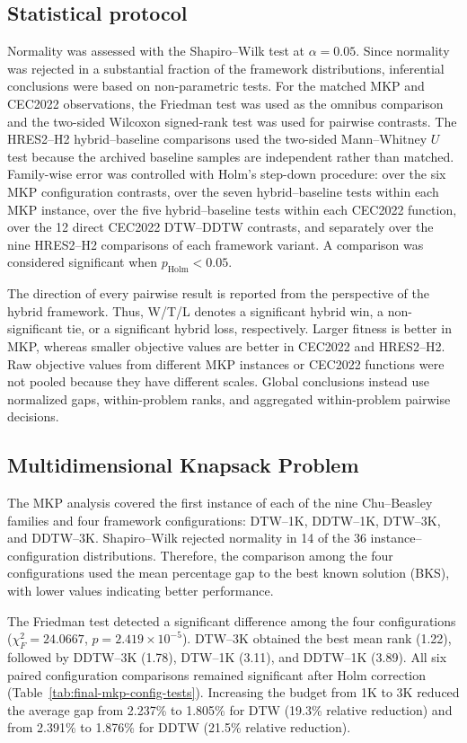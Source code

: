 \documentclass[review]{elsarticle}
\begin{document}
\subsection{Statistical protocol}

Normality was assessed with the Shapiro--Wilk test at $\alpha=0.05$. Since
normality was rejected in a substantial fraction of the framework
distributions, inferential conclusions were based on non-parametric tests. For
the matched MKP and CEC2022 observations, the Friedman test was used as the
omnibus comparison and the two-sided Wilcoxon signed-rank test was used for
pairwise contrasts. The HRES2--H2 hybrid--baseline comparisons used the
two-sided Mann--Whitney $U$ test because the archived baseline samples are
independent rather than matched. Family-wise error was controlled with Holm's
step-down procedure: over the six MKP configuration contrasts, over the seven
hybrid--baseline tests within each MKP instance, over the five
hybrid--baseline tests within each CEC2022 function, over the 12 direct
CEC2022 DTW--DDTW contrasts, and separately over the nine HRES2--H2 comparisons
of each framework variant. A comparison was considered significant when
$p_{\mathrm{Holm}}<0.05$.

The direction of every pairwise result is reported from the perspective of
the hybrid framework. Thus, W/T/L denotes a significant hybrid win, a
non-significant tie, or a significant hybrid loss, respectively. Larger
fitness is better in MKP, whereas smaller objective values are better in
CEC2022 and HRES2--H2. Raw objective values from different MKP instances or
CEC2022 functions were not pooled because they have different scales. Global
conclusions instead use normalized gaps, within-problem ranks, and aggregated
within-problem pairwise decisions.

\subsection{Multidimensional Knapsack Problem}
\label{sec:final-stat-mkp}

The MKP analysis covered the first instance of each of the nine Chu--Beasley
families and four framework configurations: DTW--1K, DDTW--1K, DTW--3K, and
DDTW--3K. Shapiro--Wilk rejected normality in 14 of the 36
instance--configuration distributions. Therefore, the comparison among the
four configurations used the mean percentage gap to the best known solution
(BKS), with lower values indicating better performance.

The Friedman test detected a significant difference among the four
configurations ($\chi_F^2=24.0667$, $p=2.419\times10^{-5}$). DTW--3K obtained
the best mean rank (1.22), followed by DDTW--3K (1.78), DTW--1K (3.11), and
DDTW--1K (3.89). All six paired configuration comparisons remained
significant after Holm correction (Table~\ref{tab:final-mkp-config-tests}).
Increasing the budget from 1K to 3K reduced the average gap from 2.237\% to
1.805\% for DTW (19.3\% relative reduction) and from 2.391\% to 1.876\% for
DDTW (21.5\% relative reduction).
\end{document}
